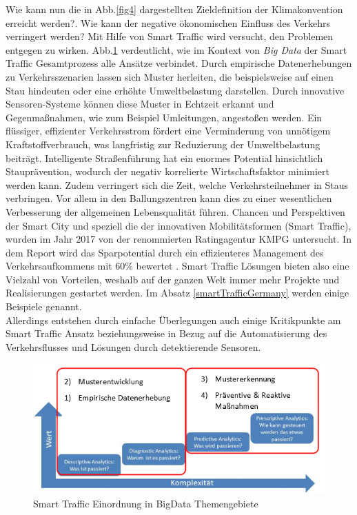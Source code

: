 Wie kann nun die in Abb.\ref{fig4} dargestellten Zieldefinition der Klimakonvention erreicht werden?. Wie kann der negative ökonomischen Einfluss des Verkehrs verringert werden? Mit Hilfe von Smart Traffic wird versucht, den Problemen entgegen zu wirken. Abb.\ref{fig13} verdeutlicht, wie im Kontext von \emph{Big Data} der Smart Traffic Gesamtprozess alle Ansätze verbindet. Durch empirische Datenerhebungen zu Verkehrsszenarien lassen sich Muster herleiten, die beispielsweise auf einen Stau hindeuten oder eine erhöhte Umweltbelastung darstellen. Durch innovative Sensoren-Systeme können diese Muster in Echtzeit erkannt und Gegenmaßnahmen, wie zum Beispiel Umleitungen, angestoßen werden.
Ein flüssiger, effizienter Verkehrsstrom fördert eine Verminderung von unnötigem Kraftstoffverbrauch, was langfristig zur Reduzierung der Umweltbelastung beiträgt. Intelligente Straßenführung hat ein enormes Potential hinsichtlich Stauprävention, wodurch der negativ korrelierte Wirtschaftsfaktor minimiert werden kann. Zudem verringert sich die Zeit, welche Verkehrsteilnehmer in Staus verbringen. Vor allem in den Ballungszentren kann dies zu einer wesentlichen Verbesserung der allgemeinen Lebensqualität führen. Chancen und Perspektiven der Smart City und speziell die der innovativen Mobilitätsformen (Smart Traffic), wurden im Jahr 2017 von der renommierten Ratingagentur KMPG untersucht. In dem Report wird das Sparpotential durch ein effizienteres Management des Verkehrsaufkommens mit 60\% bewertet \citep[vgl.][]{KPMG.2017}. Smart Traffic Lösungen bieten also eine Vielzahl von Vorteilen, weshalb auf der ganzen Welt immer mehr Projekte und Realisierungen gestartet werden. Im Absatz \ref{smartTrafficGermany} werden einige Beispiele genannt.\\ 
Allerdings entstehen durch einfache Überlegungen auch einige Kritikpunkte am Smart Traffic Ansatz beziehungsweise in Bezug auf die Automatisierung des Verkehrsflusses und Lösungen durch detektierende Sensoren. 

\begin{figure}[ht]
\begin{center}
	\includegraphics[scale=0.5]{images/SmartTrafficEinordnungBigDataThemengebiete.png}
	\caption{Smart Traffic Einordnung in BigData Themengebiete \citep[in Anlehnung an][]{RyoheiFujimaki.2016}}
	\label{fig13}
\end{center}

\end{figure}

